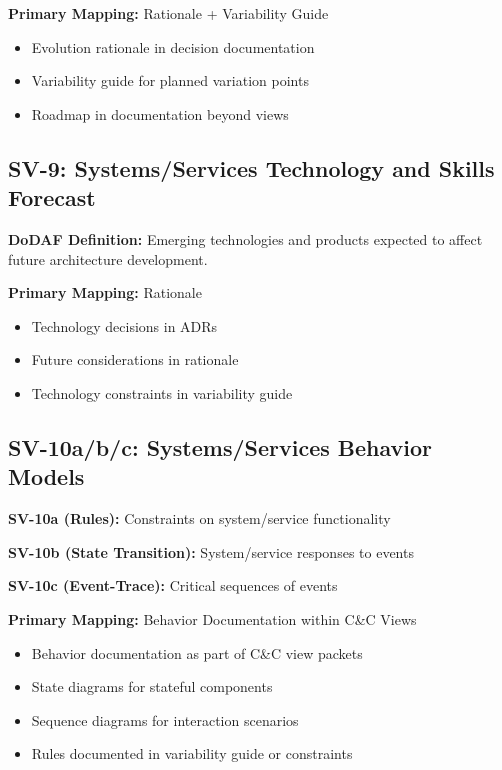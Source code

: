 \documentclass[11pt]{article}
\begin{document}
\begin{vbbox}
\textbf{Primary Mapping:} Rationale + Variability Guide

\begin{itemize}
    \item Evolution rationale in decision documentation
    \item Variability guide for planned variation points
    \item Roadmap in documentation beyond views
\end{itemize}
\end{vbbox}

\subsection{SV-9: Systems/Services Technology and Skills Forecast}

\begin{dodafbox}
\textbf{DoDAF Definition:} Emerging technologies and products expected to affect future architecture development.
\end{dodafbox}

\begin{vbbox}
\textbf{Primary Mapping:} Rationale

\begin{itemize}
    \item Technology decisions in ADRs
    \item Future considerations in rationale
    \item Technology constraints in variability guide
\end{itemize}
\end{vbbox}

\subsection{SV-10a/b/c: Systems/Services Behavior Models}

\begin{dodafbox}
\textbf{SV-10a (Rules):} Constraints on system/service functionality

\textbf{SV-10b (State Transition):} System/service responses to events

\textbf{SV-10c (Event-Trace):} Critical sequences of events
\end{dodafbox}

\begin{vbbox}
\textbf{Primary Mapping:} Behavior Documentation within C\&C Views

\begin{itemize}
    \item Behavior documentation as part of C\&C view packets
    \item State diagrams for stateful components
    \item Sequence diagrams for interaction scenarios
    \item Rules documented in variability guide or constraints
\end{itemize}
\end{vbbox}
\end{document}
